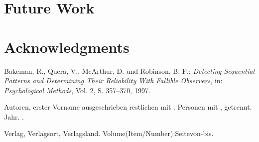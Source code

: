 \documentclass[11pt,a4paper]{article}
\begin{document}
\section{Future Work}
 \label{sec:Future Work}
 

\section*{Acknowledgments}
 
 
 
%
%

\begin{thebibliography}{}

Bakeman, R., Quera, V., McArthur, D. und Robinson, B. F.: {\em Detecting Sequential Patterns and Determining Their Reliability With Fallible Observers}, in: {\em Psychological Methods}, Vol. 2, S. 357--370, 1997. 



{Autoren, erster Vorname ausgeschrieben restlichen mit . Personen mit , getrennt}.
\newblock Jahr.
.
\begin{comment}
italic text:
Titel nur bei Büchern,
Artikel der Journal Name,
Workshop
Abschnitt in einem Buch nicht italic
\end{comment}
\newblock Verlag, Verlagsort, Verlagsland.
\newblock Volume(Item/Number):Seitevon-bis. 
\begin{comment}
	Volume durchlaufend 
	Number jahrbezogen
\end{comment}
\end{thebibliography}
\end{document}
